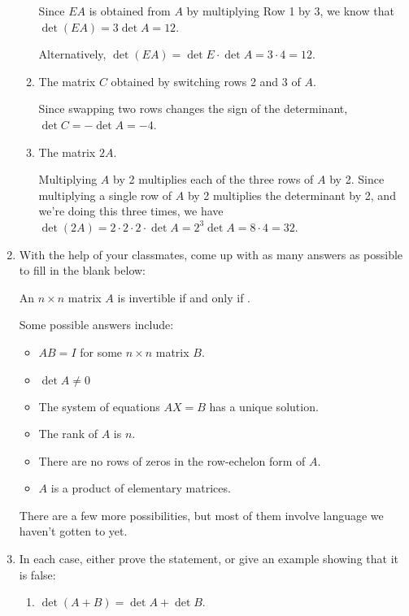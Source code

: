 \documentclass[12pt]{article}
\begin{document}
\begin{enumerate}
\begin{enumerate}
\medskip

Since $EA$ is obtained from $A$ by multiplying Row 1 by 3, we know that $\det(EA) = 3\det A = 12$.

Alternatively, $\det(EA) = \det E\cdot \det A = 3\cdot 4 = 12$.

 \item The matrix $C$ obtained by switching rows 2 and 3 of $A$.

\medskip

Since swapping two rows changes the sign of the determinant, $\det C = -\det A = -4$.


 \item The matrix $2A$.

\medskip

Multiplying $A$ by 2 multiplies each of the three rows of $A$ by 2. Since multiplying a single row of $A$ by 2 multiplies the determinant by 2, and we're doing this three times, we have $\det (2A) = 2\cdot 2\cdot 2\cdot \det A = 2^3 \det A = 8\cdot 4 = 32$.

\end{enumerate}

\pagebreak

\item With the help of your classmates, come up with as many answers as possible to fill in the blank below:

\medskip

An $n\times n$ matrix $A$ is invertible if and only if \underline{\hspace{2in}}.

\medskip

Some possible answers include:
\begin{itemize}
 \item $AB = I$ for some $n\times n$ matrix $B$.
 \item $\det A\neq 0$
 \item The system of equations $AX=B$ has a unique solution.
 \item The rank of $A$ is $n$.
 \item There are no rows of zeros in the row-echelon form of $A$.
 \item $A$ is a product of elementary matrices.
\end{itemize}
There are a few more possibilities, but most of them involve language we haven't gotten to yet.

\item In each case, either prove the statement, or give an example showing that it is false:
\begin{enumerate}
 \item $\det(A+B)=\det A+\det B$.


\end{enumerate}
\end{enumerate}
\end{document}
